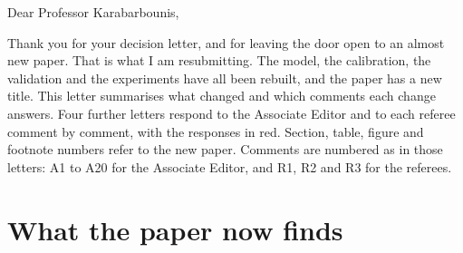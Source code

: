 \documentclass[11pt]{article}
\begin{document}

Dear Professor Karabarbounis,

Thank you for your decision letter, and for leaving the door open to an almost new
paper. That is what I am resubmitting. The model, the calibration, the validation and
the experiments have all been rebuilt, and the paper has a new title. This letter
summarises what changed and which comments each change answers. Four further letters
respond to the Associate Editor and to each referee comment by comment, with the
responses in red. Section, table, figure and footnote numbers refer to the new paper. Comments are
numbered as in those letters: A1 to A20 for the Associate Editor, and R1, R2 and R3 for the
referees.

\section*{\color{respred}What the paper now finds}
\end{document}
